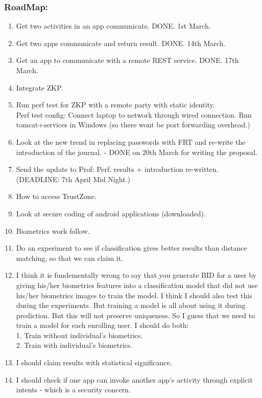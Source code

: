 \documentclass[11pt]{article}
\begin{document}
\subsubsection*{RoadMap:}
\begin{enumerate}
 \item Get two activities in an app communicate. DONE. 1st March.
 \item Get two apps communicate and return result. DONE. 14th March.
 \item Get an app to communicate with a remote REST service. DONE. 17th March.
 \item Integrate ZKP.
 \item Run perf test for ZKP with a remote party with static identity.\\
 Perf test config: Connect laptop to network through wired connection. Run tomcat+services in Windows (so there wont be port forwarding overhead.)
 \item Look at the new trend in replacing passwords with FRT and re-write the introduction of the journal. - DONE on 20th March for writing the 
proposal.
 \item Send the update to Prof: Perf. results + introduction re-written. (DEADLINE: 7th April Mid Night.)
 \item How to access TrustZone.
 \item Look at secure coding of android applications (downloaded).
 \item Biometrics work follow.
 \item
  Do an experiment to see if classification gives better results than distance matching, so that we can claim it.
 \item I think it is fundementally wrong to say that you generate BID for a user by giving his/her biometrics features into a classification model 
that   did not use his/her biometrics images to train the model. I think I should also test this during the experiments. But training a model is all 
about using it during prediction. But this will not preserve uniqueness. So I guess that we need to train a model for each enrolling user.
I should do both:\\
1. Train without individual's biometrics.\\
2. Train with individual's biometrics.\\
\item I should claim results with statistical significance.
\item I should check if one app can invoke another app's activity through explicit intents - which is a security concern.
\end{enumerate}
\end{document}
